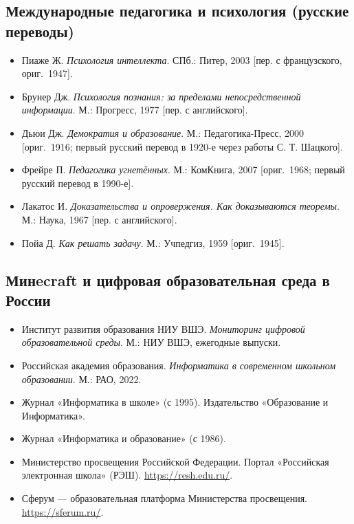 \documentclass[12pt,a4paper]{scrartcl}
\begin{document}
\subsection{Международные педагогика и психология (русские переводы)}
\begin{itemize}[leftmargin=1.3em,itemsep=0.15em,topsep=0.3em]
  \item Пиаже Ж. \emph{Психология интеллекта}. СПб.: Питер, 2003 [пер. с французского, ориг.~1947].
  \item Брунер Дж. \emph{Психология познания: за пределами непосредственной информации}. М.: Прогресс, 1977 [пер. с английского].
  \item Дьюи Дж. \emph{Демократия и образование}. М.: Педагогика-Пресс, 2000 [ориг.~1916; первый русский перевод в 1920-е через работы С. Т. Шацкого].
  \item Фрейре П. \emph{Педагогика угнетённых}. М.: КомКнига, 2007 [ориг.~1968; первый русский перевод в 1990-е].
  \item Лакатос И. \emph{Доказательства и опровержения. Как доказываются теоремы}. М.: Наука, 1967 [пер. с английского].
  \item Пойа Д. \emph{Как решать задачу}. М.: Учпедгиз, 1959 [ориг.~1945].
\end{itemize}

\subsection{Минecraft и цифровая образовательная среда в России}
\begin{itemize}[leftmargin=1.3em,itemsep=0.15em,topsep=0.3em]
  \item Институт развития образования НИУ ВШЭ. \emph{Мониторинг цифровой образовательной среды}. М.: НИУ ВШЭ, ежегодные выпуски.
  \item Российская академия образования. \emph{Информатика в современном школьном образовании}. М.: РАО, 2022.
  \item Журнал «Информатика в школе» (с 1995). Издательство «Образование и Информатика».
  \item Журнал «Информатика и образование» (с 1986).
  \item Министерство просвещения Российской Федерации. Портал «Российская электронная школа» (РЭШ). \url{https://resh.edu.ru/}.
  \item Сферум --- образовательная платформа Министерства просвещения. \url{https://sferum.ru/}.
\end{itemize}
\end{document}
